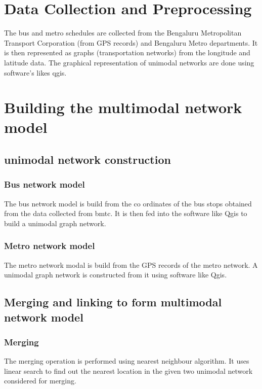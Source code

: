 \documentclass[12pt,a4paper]{article}
\begin{document}
\section{Data Collection and Preprocessing}

The bus and metro schedules are collected from the Bengaluru Metropolitan Transport Corporation (from GPS records) and Bengaluru Metro departments. It is then represented as graphs (transportation networks) from the longitude and latitude data. The graphical representation of unimodal networks are done using software's likes qgis. 

\section{Building the multimodal network model}



\subsection{unimodal network construction}

\subsubsection{Bus network model}
The bus network model is build from the co ordinates of the bus stops obtained from the data collected from bmtc. It is then fed into the software like Qgis to build a unimodal graph network.

\subsubsection{Metro network model}
The metro network modal is build from the GPS records of the metro network. A unimodal graph network is constructed from it using software like Qgis.

\subsection{Merging and linking to form multimodal network model}

\subsubsection{Merging}

The merging operation is performed using nearest neighbour algorithm. It uses linear search to find out the nearest location in the given two unimodal network considered for merging.
\end{document}
